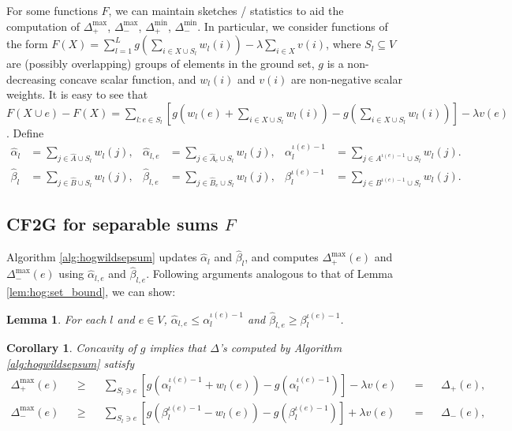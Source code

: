 \documentclass{article} %
\newcommand{\hogwild}{CF2G}
\newtheorem{cor}[thm]{Corollary}
\newtheorem{lem}[thm]{Lemma}
\begin{document}
For some functions $F$, we can maintain sketches / statistics to aid the computation of $\Delta_+^{\max}$, $\Delta_-^{\max}$, $\Delta_+^{\min}$, $\Delta_-^{\min}$.
In particular, we consider functions of the form
$F(X) = \sum_{l=1}^L g\left(\sum_{i\in X\cup S_l} w_l(i)\right) - \lambda\sum_{i\in X} v(i)$,
where $S_l \subseteq V$ are (possibly overlapping) groups of elements in the ground set, $g$ is a non-decreasing concave scalar function, and $w_l(i)$ and $v(i)$ are non-negative scalar weights.
It is easy to see that
$
F(X \cup e) - F(X) = \sum_{l: e\in S_l} \left[g\left(w_l(e) + \sum_{i\in X\cup S_l} w_l(i)\right) - g\left(\sum_{i\in X\cup S_l} w_l(i)\right)\right] - \lambda v(e)$.
Define
%
%
\begin{align*}
  \hat\alpha_l              &= \sum_{j\in \hat{A}\cup S_l} w_l(j),
& \hat\alpha_{l,e}          &= \sum_{j\in \hat{A}_e\cup S_l} w_l(j),
& \alpha_l^{\iota(e)-1} &= \sum_{j\in A^{\iota(e)-1}\cup S_l} w_l(j).\\
  \hat\beta_l              &= \sum_{j\in \hat{B}\cup S_l} w_l(j),
& \hat\beta_{l,e}          &= \sum_{j\in \hat{B}_e\cup S_l} w_l(j),
& \beta_l^{\iota(e)-1} &= \sum_{j\in B^{\iota(e)-1}\cup S_l} w_l(j).
\end{align*}


\subsection{\hogwild{} for separable sums $F$}
Algorithm \ref{alg:hogwildsepsum} updates $\hat\alpha_l$ and $\hat\beta_l$, and computes $\Delta_+^{\max}(e)$ and $\Delta_-^{\max}(e)$ using $\hat\alpha_{l,e}$ and $\hat\beta_{l,e}$.
Following arguments analogous to that of Lemma \ref{lem:hog:set_bound}, we can show:

\begin{lem} For each $l$ and $e\in V$, $\hat\alpha_{l,e} \leq \alpha_l^{\iota(e)-1}$ and $\hat\beta_{l,e} \geq \beta_l^{\iota(e)-1}$.
\end{lem}

\begin{cor} Concavity of $g$ implies that $\Delta$'s computed by Algorithm \ref{alg:hogwildsepsum} satisfy
\begin{align*}
\Delta_+^{\max}(e)
&&\geq&& \sum_{S_l\ni e} \left[g(\alpha_l^{\iota(e)-1} + w_l(e)) - g(\alpha_l^{\iota(e)-1})\right] - \lambda v(e)
&&=&& \Delta_+(e),\\
\Delta_-^{\max}(e)
&&\geq&& \sum_{S_l\ni e} \left[g(\beta_l^{\iota(e)-1} - w_l(e)) - g(\beta_l^{\iota(e)-1})\right] + \lambda v(e)
&&=&& \Delta_-(e),
\end{align*}
\end{cor}
\end{document}

